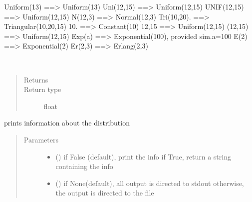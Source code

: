 \documentclass[letterpaper,10pt,english]{sphinxmanual}
\begin{document}
\begin{fulllineitems}
Uniform(13)  ==\textgreater{} Uniform(13) 
Uni(12,15)   ==\textgreater{} Uniform(12,15) 
UNIF(12,15)  ==\textgreater{} Uniform(12,15) 
N(12,3)      ==\textgreater{} Normal(12,3) 
Tri(10,20).  ==\textgreater{} Triangular(10,20,15) 
10.          ==\textgreater{} Constant(10) 
12,15        ==\textgreater{} Uniform(12,15) 
(12,15)      ==\textgreater{} Uniform(12,15) 
Exp(a)       ==\textgreater{} Exponential(100), provided sim.a=100 
E(2)         ==\textgreater{} Exponential(2)
Er(2,3)      ==\textgreater{} Erlang(2,3)

\begin{fulllineitems}
\label{\detokenize{Reference:salabim.Distribution.mean}}~\begin{quote}\begin{description}
\item[{Returns}] \leavevmode
{}

\item[{Return type}] \leavevmode
float

\end{description}\end{quote}

\end{fulllineitems}


\begin{fulllineitems}
\label{\detokenize{Reference:salabim.Distribution.print_info}}
prints information about the distribution
\begin{quote}\begin{description}
\item[{Parameters}] \leavevmode\begin{itemize}
\item {} 
 () \textendash{} if False (default), print the info
if True, return a string containing the info

\item {} 
 () \textendash{} if None(default), all output is directed to stdout 
otherwise, the output is directed to the file

\end{itemize}


\end{description}
\end{quote}
\end{fulllineitems}
\end{fulllineitems}
\end{document}
